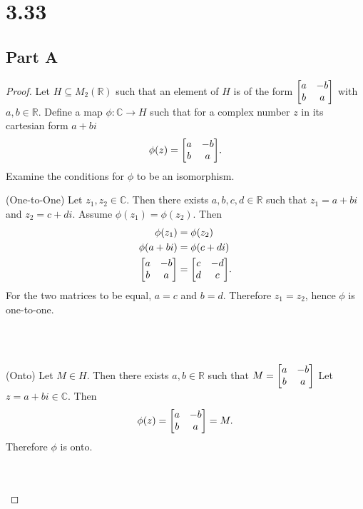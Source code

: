 \documentclass[12pt]{extarticle}
\begin{document}
\section*{3.33}
\subsection*{Part A}
\begin{proof}
	Let $H \subseteq M_2(\mathbb{R})$ such that an element of $H$ is of the form $\mqty[a & -b \\ b & a]$ with $a,b \in \mathbb{R}$. Define a map $\phi : \mathbb{C} \to H$ such that for a complex number $z$ in its cartesian form $a + bi$
	\[
		\phi(z) = \mqty[a & -b \\ b & a]
	.\]
	Examine the conditions for $\phi$ to be an isomorphism. \\

	\qquad\begin{minipage}{\dimexpr\textwidth-2cm}
		(One-to-One)\quad 
		Let $z_1, z_2 \in \mathbb{C}$. Then there exists $a,b,c,d \in \mathbb{R}$ such that $z_1 = a+bi$ and $z_2 = c+di$. Assume $\phi(z_1) = \phi(z_2)$. Then
		\begin{align*}
			\phi(z_1) &= \phi(z_2) \\
			\phi(a+bi) &= \phi(c+di) \\
			\mqty[a & -b \\ b & a] &= \mqty[c & -d \\ d & c]
		.\end{align*}
		For the two matrices to be equal, $a = c$ and $b = d$. Therefore $z_1 = z_2$, hence $\phi$ is one-to-one.
	\end{minipage} \\
	\\

	\qquad\begin{minipage}{\dimexpr\textwidth-2cm}
		(Onto)\quad 
		Let $M \in H$. Then there exists $a,b \in \mathbb{R}$ such that
		$
			M = \mqty[a & -b \\ b & a]
		$
		Let $z = a+bi \in \mathbb{C}$. Then
		\[
			\phi(z) = \mqty[a & -b \\ b & a] = M
		.\]
		Therefore $\phi$ is onto.
	\end{minipage} \\
	\\


\end{proof}
\end{document}
